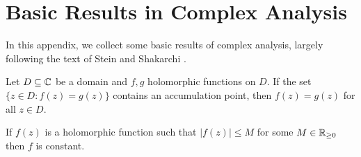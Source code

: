 \section{Basic Results in Complex Analysis}\label{app: basic results}
In this appendix, we collect some basic results of complex analysis, largely following the text of Stein and Shakarchi \cite{SteinShakarchi}.
\begin{theorem}[Identity]\label{thm: identity theorem}
    Let $D\subseteq\mathbb{C}$ be a domain and $f,g$ holomorphic functions on $D$. If the set $\{z\in D:f(z)=g(z)\}$ contains an accumulation point, then $f(z)=g(z)$ for all $z\in D$. 
\end{theorem}
\begin{theorem}[Liouville]\label{thm: Liouville}
    If $f(z)$ is a holomorphic function such that $|f(z)|\leq M$ for some $M\in\mathbb{R}_{\geq0}$ then $f$ is constant. 
\end{theorem}